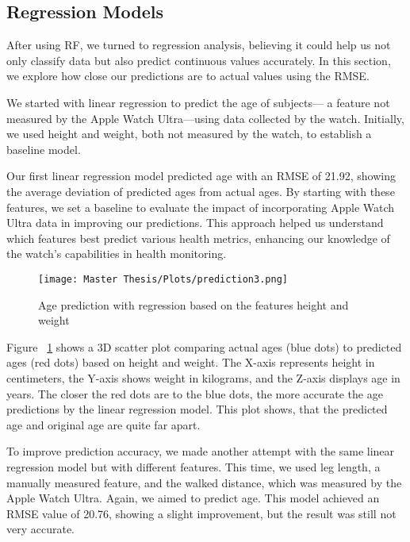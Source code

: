 \subsection{Regression Models}

After using RF, we turned to regression analysis, believing it could help us not only classify data but also predict continuous values accurately. In this section, we explore how close our predictions are to actual values using the RMSE.

We started with linear regression to predict the age of subjects— a feature not measured by the Apple Watch Ultra—using data collected by the watch. Initially, we used height and weight, both not measured by the watch, to establish a baseline model.

Our first linear regression model predicted age with an RMSE of 21.92, showing the average deviation of predicted ages from actual ages. By starting with these features, we set a baseline to evaluate the impact of incorporating Apple Watch Ultra data in improving our predictions. This approach helped us understand which features best predict various health metrics, enhancing our knowledge of the watch's capabilities in health monitoring.

\FloatBarrier
\begin{figure}[h!]
\centering
\texttt{[image: Master Thesis/Plots/prediction3.png]}
\caption{Age prediction with regression based on the features height and weight}
\label{figure:regwithheightweight}
\end{figure}
\FloatBarrier

Figure ~\ref{figure:regwithheightweight} shows a 3D scatter plot comparing actual ages (blue dots) to predicted ages (red dots) based on height and weight. The X-axis represents height in centimeters, the Y-axis shows weight in kilograms, and the Z-axis displays age in years. The closer the red dots are to the blue dots, the more accurate the age predictions by the linear regression model. This plot shows, that the predicted age and original age are quite far apart.

To improve prediction accuracy, we made another attempt with the same linear regression model but with different features. This time, we used leg length, a manually measured feature, and the walked distance, which was measured by the Apple Watch Ultra. Again, we aimed to predict age. This model achieved an RMSE value of 20.76, showing a slight improvement, but the result was still not very accurate.

